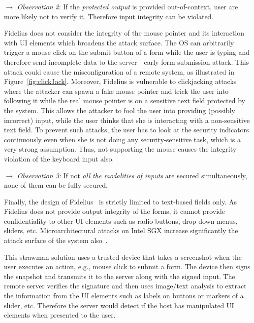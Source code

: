 \noindent\emph{$\rightarrow$ Observation 2}: If the \emph{protected output} is provided out-of-context, user are more likely not to verify it. Therefore input integrity can be violated.


Fidelius does not consider the integrity of the mouse pointer and its interaction with UI elements which broadens the attack surface. The OS can arbitrarily trigger a mouse click on the submit button of a form while the user is typing and therefore send incomplete data to the server - early form submission attack.
This attack could cause the misconfiguration of a remote system, as illustrated in Figure~\ref{fig:clickJack}.
Moreover, Fidelius is vulnerable to clickjacking attacks where the attacker can spawn a fake mouse pointer and trick the user into following it while the real mouse pointer is on a sensitive text field protected by the system. This allows the attacker to fool the user into providing (possibly incorrect) input, while the user thinks that she is interacting with a non-sensitive text field. To prevent such attacks, the user has to look at the security indicators continuously even when she is not doing any security-sensitive task, which is a very strong assumption. 
Thus, not supporting the mouse causes the integrity violation of the keyboard input also.

\noindent\emph{$\rightarrow$ Observation 3:} If not \emph{all the modalities of inputs} are secured simultaneously, none of them can be fully secured.


Finally, the design of Fidelius~\cite{Fidelius} is strictly limited to text-based fields only. As Fidelius does not provide output integrity of the forms, it cannot provide confidentiality to other UI elements such as radio buttons, drop-down menus, sliders, etc.
Microarchitectural attacks on Intel SGX increase significantly the attack surface of the system also~\cite{van2018foreshadow}.


 This strawman solution uses a trusted device that takes a screenshot when the user executes an action, e.g., mouse click to submit a form. The device then signs the snapshot and transmits it to the server along with the signed input. The remote server verifies the signature and then uses image/text analysis to extract the information from the UI elements such as labels on buttons or markers of a slider, etc. Therefore the server would detect if the host has manipulated UI elements when presented to the user.

